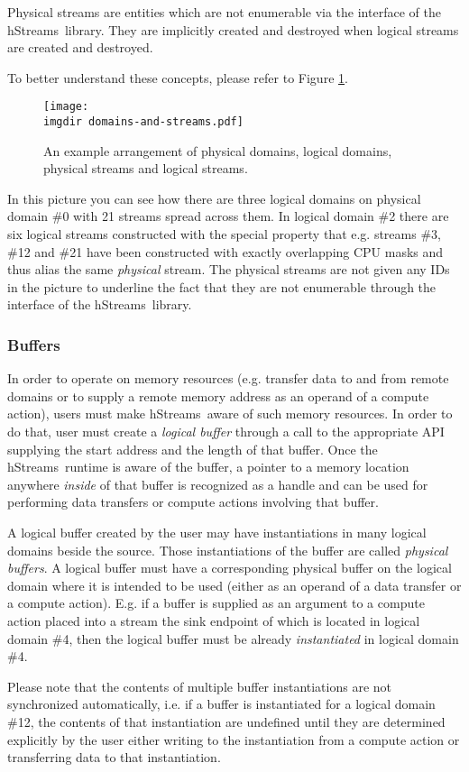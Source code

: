 \documentclass[a4,oneside]{book}
\newcommand{\hstreams}{hStreams}
\newcommand{\imgdir}{../../../doc/images/}
\begin{document}
Physical streams are entities which are not enumerable via the interface of the \hstreams\ library.
They are implicitly created and destroyed when logical streams are created and destroyed.

To better understand these concepts, please refer to Figure \ref{fig:phys-log-dom-str}.
\begin{figure}[h]
    \centering
    \texttt{[image: \\imgdir domains-and-streams.pdf]}
    \caption{An example arrangement of physical domains, logical domains, physical streams and logical streams.}
    \label{fig:phys-log-dom-str}
\end{figure}
In this picture you can see how there are three logical domains on physical domain \#0 with 21 streams spread across them.
In logical domain \#2 there are six logical streams constructed with the special property that e.g. streams \#3, \#12 and \#21 have been constructed with exactly overlapping CPU masks and thus alias the same \emph{physical} stream.
The physical streams are not given any IDs in the picture to underline the fact that they are not enumerable through the interface of the \hstreams\ library.

\subsubsection{Buffers}
In order to operate on memory resources (e.g. transfer data to and from remote domains or to supply a remote memory address as an operand of a compute action), users must make \hstreams\ aware of such memory resources.
In order to do that, user must create a \emph{logical buffer} through a call to the appropriate API supplying the start address and the length of that buffer.
Once the \hstreams\ runtime is aware of the buffer, a pointer to a memory location anywhere \emph{inside} of that buffer is recognized as a handle and can be used for performing data transfers or compute actions involving that buffer.

A logical buffer created by the user may have instantiations in many logical domains beside the source.
Those instantiations of the buffer are called \emph{physical buffers}.
A logical buffer must have a corresponding physical buffer on the logical domain where it is intended to be used (either as an operand of a data transfer or a compute action).
E.g. if a buffer is supplied as an argument to a compute action placed into a stream the sink endpoint of which is located in logical domain \#4, then the logical buffer must be already \emph{instantiated} in logical domain \#4.

Please note that the contents of multiple buffer instantiations are not synchronized automatically, i.e. if a buffer is instantiated for a logical domain \#12, the contents of that instantiation are undefined until they are determined explicitly by the user either writing to the instantiation from a compute action or transferring data to that instantiation.
\end{document}
